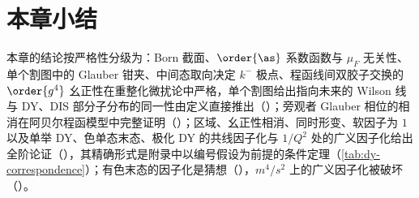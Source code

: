 \section{本章小结}\label{sec:dy-summary}

本章的结论按严格性分级为：Born 截面、$\order{\as}$ 系数函数与 $\mu_F$ 无关性、单个割图中的 Glauber 钳夹、中间态取向决定 $k^-$ 极点、程函线间双胶子交换的 $\order{g^4}$ 幺正性在重整化微扰论中严格，单个割图给出指向未来的 Wilson 线与 DY、DIS 部分子分布的同一性由定义直接推出（\tagR）；旁观者 Glauber 相位的相消在阿贝尔程函模型中完整证明（\tagP）；区域、幺正性相消、同时形变、软因子为 $1$ 以及单举 DY、色单态末态、极化 DY 的共线因子化与 $1/Q^2$ 处的广义因子化给出全阶论证（\tagA），其精确形式是附录中以编号假设为前提的条件定理（\cref{tab:dy-correspondence}）；有色末态的因子化是猜想（\tagC），$m^4/s^2$ 上的广义因子化被破坏（\tagV）。

